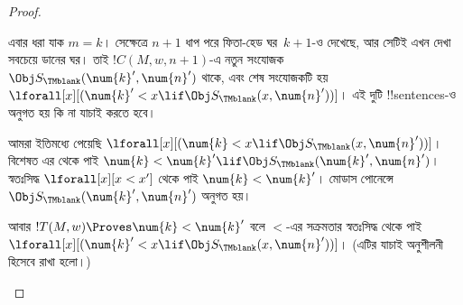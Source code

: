 \documentclass[../../../include/open-logic-section]{subfiles}
\begin{document}
\begin{proof}
\begin{enumerate}
এবার ধরা যাক $m=k$। সেক্ষেত্রে $n+1$ ধাপ পরে ফিতা-হেড ঘর~$k+1$-ও
দেখেছে, আর সেটিই এখন দেখা সবচেয়ে ডানের ঘর। তাই $!C(M,w,n+1)$-এ নতুন
সংযোজক $\Obj S_\TMblank(\num{k}',\num{n}')$ থাকে, এবং শেষ সংযোজকটি হয়
$\lforall[x][(\num{k}'<x\lif\Obj S_\TMblank(x,\num{n}'))]$। এই দুটি
!!{sentence}s-ও অনুগত হয় কি না যাচাই করতে হবে।

আমরা ইতিমধ্যে পেয়েছি
$\lforall[x][(\num{k}<x\lif\Obj S_\TMblank(x,\num{n}'))]$। বিশেষত এর
থেকে পাই
$\num{k}<\num{k}'\lif\Obj S_\TMblank(\num{k}',\num{n}')$। স্বতঃসিদ্ধ
$\lforall[x][x<x']$ থেকে পাই $\num{k}<\num{k}'$। মোডাস পোনেন্সে
$\Obj S_\TMblank(\num{k}',\num{n}')$ অনুগত হয়।

আবার $!T(M,w)\Proves\num{k}<\num{k}'$ বলে $<$-এর সক্রমতার স্বতঃসিদ্ধ
থেকে পাই
$\lforall[x][(\num{k}'<x\lif\Obj S_\TMblank(x,\num{n}'))]$। (এটির
যাচাই অনুশীলনী হিসেবে রাখা হলো।)


\end{enumerate}
\end{proof}
\end{document}

